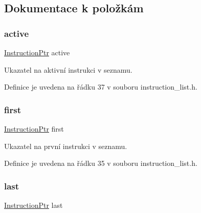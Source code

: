 \subsection{Dokumentace k položkám}
\mbox{\label{struct_s___instruction_list_a49648a14a3944a473e7b5da00f20f600}} 
\subsubsection{\texorpdfstring{active}{active}}
{\footnotesize\ttfamily \hyperlink{instruction__list_8h_aaaf9f8ee3d7203e01ba5c651c5ee8a99}{Instruction\+Ptr} active}



Ukazatel na aktivní instrukci v seznamu. 



Definice je uvedena na řádku 37 v souboru instruction\+\_\+list.\+h.

\mbox{\label{struct_s___instruction_list_a7df20b4f50a6510587e6a392e73ea905}} 
\subsubsection{\texorpdfstring{first}{first}}
{\footnotesize\ttfamily \hyperlink{instruction__list_8h_aaaf9f8ee3d7203e01ba5c651c5ee8a99}{Instruction\+Ptr} first}



Ukazatel na první instrukci v seznamu. 



Definice je uvedena na řádku 35 v souboru instruction\+\_\+list.\+h.

\mbox{\label{struct_s___instruction_list_af0c6bee15fdf9d372fdd4e24974fe110}} 
\subsubsection{\texorpdfstring{last}{last}}
{\footnotesize\ttfamily \hyperlink{instruction__list_8h_aaaf9f8ee3d7203e01ba5c651c5ee8a99}{Instruction\+Ptr} last}



